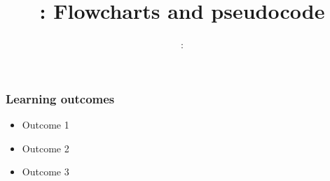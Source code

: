 \usepackage{../../beamerthemeFalmouthGamesAcademy}
\usepackage{multimedia}
\graphicspath{ {../../} }

\lstset{language=Python
}

\usepackage[normalem]{ulem}
\usepackage{wasysym}

\usepackage{pdfpages}

\usetikzlibrary{arrows,automata}




\title{\sessionnumber: Flowcharts and pseudocode}
\subtitle{\modulecode: \moduletitle}

\frame{\titlepage} 

\begin{frame}
	\frametitle{Learning outcomes}
	\begin{itemize}
		\item Outcome 1
		\item Outcome 2
		\item Outcome 3
	\end{itemize}
\end{frame}






